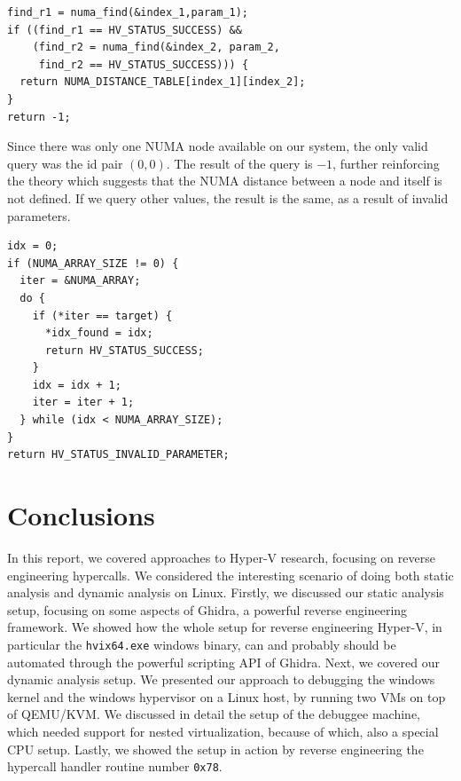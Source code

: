 \documentclass[runningheads]{llncs}
\newcommand{\cc}{\lstinline[mathescape]}
\begin{document}
\vspace{1mm}

\begin{lstlisting}[caption={Main part of the \cc{get_numa_distance} function
    decompilation from Ghidra.}, label={lst:get_numa}] 
find_r1 = numa_find(&index_1,param_1);
if ((find_r1 == HV_STATUS_SUCCESS) &&
    (find_r2 = numa_find(&index_2, param_2,
     find_r2 == HV_STATUS_SUCCESS))) {
  return NUMA_DISTANCE_TABLE[index_1][index_2];
}
return -1;
\end{lstlisting}

Since there was only one NUMA node available on our system, the only valid
query was the id pair $(0, 0)$. The result of the query is $-1$, further
reinforcing the theory which suggests that the NUMA distance between a node and
itself is not defined. If we query other values, the result is the same, as a
result of invalid parameters.

\vspace{1mm}
\begin{lstlisting}[label={lst:array}, caption={Main part of the
    \cc{numa_find} function decompilation from Ghidra.}]
idx = 0;
if (NUMA_ARRAY_SIZE != 0) {
  iter = &NUMA_ARRAY;
  do {
    if (*iter == target) {
      *idx_found = idx;
      return HV_STATUS_SUCCESS;
    }
    idx = idx + 1;
    iter = iter + 1;
  } while (idx < NUMA_ARRAY_SIZE);
}
return HV_STATUS_INVALID_PARAMETER;
\end{lstlisting}

\section{Conclusions}
\label{sec:conc}

In this report, we covered approaches to Hyper-V research, focusing on reverse
engineering hypercalls. We considered the interesting scenario of doing both
static analysis and dynamic analysis on Linux. Firstly, we discussed our static
analysis setup, focusing on some aspects of Ghidra, a powerful reverse
engineering framework. We showed how the whole setup for reverse engineering
Hyper-V, in particular the \cc{hvix64.exe} windows binary, can and probably
should be automated through the powerful scripting API of Ghidra. Next, we
covered our dynamic analysis setup. We presented our approach to debugging the
windows kernel and the windows hypervisor on a Linux host, by running two VMs
on top of QEMU/KVM. We discussed in detail the setup of the debuggee machine,
which needed support for nested virtualization, because of which, also a special
CPU setup. Lastly, we showed the setup in action by reverse engineering the
hypercall handler routine number \cc{0x78}.
\end{document}

